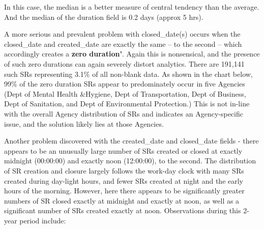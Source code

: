 \documentclass[12pt, titlepage]{article}
\begin{document}
		
In this case, the median is a better measure of central tendency than the average. 
And the median of the duration field is  0.2 days (approx 5 hrs). 
		
	
		
\label{sec: zeroduration}		
A more serious and prevalent problem with closed\_date(s) 
occurs when the closed\_date and created\_date are exactly the same -- to 
the second -- which accordingly creates a \textbf{zero duration'}. Again 
this is nonsensical, and the presence of such zero durations can again 
severely distort analytics. There are 191,141 such SRs representing 3.1\% of 
all non-blank data. As shown in the chart 	below, 99\% of the 
zero duration SRs appear to predominately occur in five 
Agencies (Dept of Mental Health \&Hygiene, Dept of Transportation, 
Dept of Business, Dept of Sanitation, and Dept of Environmental Protection.) 
This is not in-line with the overall Agency distribution of SRs and indicates an 
Agency-specific issue, and the solution likely lies at those Agencies.
	
		

		
\label{sec:midnightandnoon}
Another problem discovered with the created\_date and 
closed\_date fields - there appears to be an unusually large number of SRs 
created or closed at exactly midnight (00:00:00) and exactly noon (12:00:00), 
to the second. The distribution of SR creation and closure largely follows the 
work-day clock with many SRs created during day-light hours, and 
fewer SRs 	created at night and the early hours of the morning. However, 
here there appears to be significantly greater numbers of SR closed exactly 
at midnight and exactly at noon, as well as a significant number of SRs 
created exactly at noon. Observations during this 2-year period include:
\end{document}

